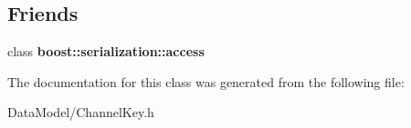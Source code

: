 \subsection*{Friends}
\begin{DoxyCompactItemize}
\item 
\hypertarget{classChannelKey_ac98d07dd8f7b70e16ccb9a01abf56b9c}{
class {\bfseries boost::serialization::access}}
\label{classChannelKey_ac98d07dd8f7b70e16ccb9a01abf56b9c}

\end{DoxyCompactItemize}


The documentation for this class was generated from the following file:\begin{DoxyCompactItemize}
\item 
DataModel/ChannelKey.h\end{DoxyCompactItemize}
